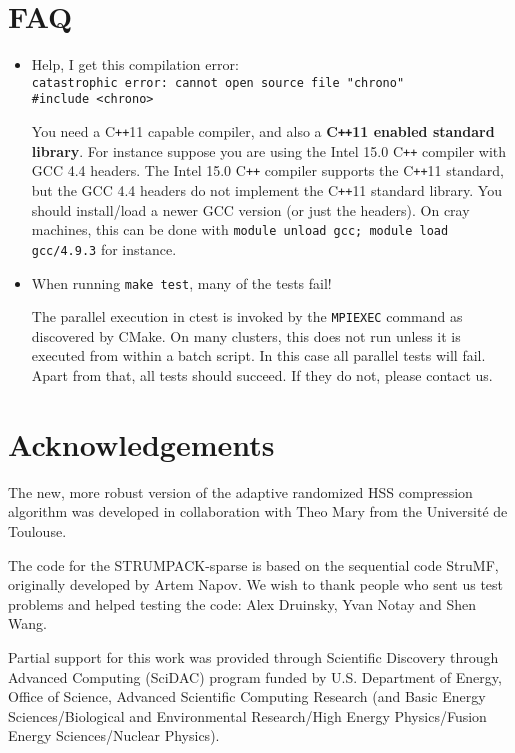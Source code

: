 \documentclass{article}
\begin{document}
\section{FAQ}

\begin{itemize}
\item Help, I get this compilation error:\\
  \verb!catastrophic error: cannot open source file "chrono"! \\
  \verb!#include <chrono>!

  You need a C\texttt{++}11 capable compiler, and also a
  \textbf{C\texttt{++}11 enabled standard library}. For instance
  suppose you are using the Intel 15.0 C\texttt{++} compiler with GCC
  4.4 headers. The Intel 15.0 C\texttt{++} compiler supports the
  C\texttt{++}11 standard, but the GCC 4.4 headers do not implement
  the C\texttt{++}11 standard library. You should install/load a newer
  GCC version (or just the headers). On cray machines, this can be
  done with \lstinline[style=Bash]!module unload gcc; module load gcc/4.9.3!
  for instance.

\item When running \lstinline[style=Bash]!make test!, many of the
  tests fail!

  The parallel execution in ctest is invoked by the
  \lstinline[style=Bash]!MPIEXEC! command as discovered by CMake. On
  many clusters, this does not run unless it is executed from within a
  batch script. In this case all parallel tests will fail. Apart from
  that, all tests should succeed. If they do not, please contact us.
\end{itemize}


\section{Acknowledgements}
The new, more robust version of the adaptive randomized HSS
compression algorithm was developed in collaboration with Theo Mary
from the Universit\'e de Toulouse.

The code for the STRUMPACK-sparse is based on the sequential code
StruMF, originally developed by Artem Napov. We wish to thank people
who sent us test problems and helped testing the code: Alex Druinsky,
Yvan Notay and Shen Wang.

Partial support for this work was provided through Scientific
Discovery through Advanced Computing (SciDAC) program funded by
U.S. Department of Energy, Office of Science, Advanced Scientific
Computing Research (and Basic Energy Sciences/Biological and
Environmental Research/High Energy Physics/Fusion Energy
Sciences/Nuclear Physics).
\end{document}
